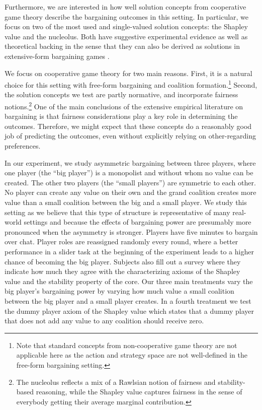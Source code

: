Furthermore, we are interested in how well solution concepts from cooperative game theory describe the bargaining outcomes in this setting. In particular, we focus on two of the most used and single-valued solution concepts: the Shapley value and the nucleolus. Both have suggestive experimental evidence \parencite{MurnighanRoth1977, MichenerPotter1981, ClippelRozen2022, KomoritaHamiltonKravitz1984, LeopoldWildburger1992} as well as theoretical backing in the sense that they can also be derived as solutions in extensive-form bargaining games \parencite{gul1989bargaining,hart1996bargaining,stole1996organizational}.

We focus on cooperative game theory for two main reasons. First, it is a natural choice for this setting with free-form bargaining and coalition formation.\footnote{Note that standard concepts from non-cooperative game theory are not applicable here as the action and strategy space are not well-defined in the free-form bargaining setting.} Second, the solution concepts we test are partly normative, and incorporate fairness notions.\footnote{The nucleolus reflects a mix of a Rawlsian notion of fairness and stability-based reasoning, while the Shapley value captures fairness in the sense of everybody getting their average marginal contribution.} One of the main conclusions of the extensive empirical literature on bargaining is that fairness considerations play a key role in determining the outcomes. Therefore, we might expect that these concepts do a reasonably good job of predicting the outcomes, even without explicitly relying on other-regarding preferences.

In our experiment, we study asymmetric bargaining between three players, where one player (the ``big player'') is a monopolist and without whom no value can be created. The other two players (the ``small players'') are symmetric to each other. No player can create any value on their own and the grand coalition creates more value than a small coalition between the big and a small player. We study this setting as we believe that this type of structure is representative of many real-world settings and because the effects of bargaining power are presumably more pronounced when the asymmetry is stronger. Players have five minutes to bargain over chat. Player roles are reassigned randomly every round, where a better performance in a slider task at the beginning of the experiment leads to a higher chance of becoming the big player. Subjects also fill out a survey where they indicate how much they agree with the characterizing axioms of the Shapley value and the stability property of the core. Our three main treatments vary the big player's bargaining power by varying how much value a small coalition between the big player and a small player creates. In a fourth treatment we test the dummy player axiom of the Shapley value which states that a dummy player that does not add any value to any coalition should receive zero.


